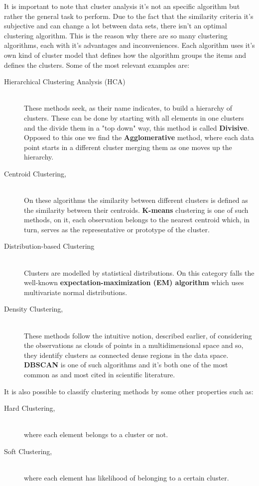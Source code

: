 It is important to note that cluster analysis it's not an specific algorithm but rather the general task to perform. Due to the fact that the similarity criteria it's subjective and can change a lot between data sets, there isn't an optimal clustering algorithm. This is the reason why there are so many  clustering algorithms, each with it's advantages and inconveniences. Each algorithm uses it's own kind of cluster model that defines how the algorithm groups the items and defines the clusters. Some of the most relevant examples are:

\begin{description}
\item [Hierarchical Clustering Analysis (HCA)] \hfill \\ 
These methods seek, as their name indicates, to build a hierarchy of clusters. These can be done by starting with all elements in one clusters and the divide them in a "top down" way, this method is called \textbf{Divisive}. Opposed to this one we find the \textbf{Agglomerative} method, where each data point starts in a different cluster merging them as one moves up the hierarchy.
\item [Centroid Clustering,] \hfill \\ 
On these algorithms the similarity between different clusters is defined as the similarity between their centroids. \textbf{K-means} clustering is one of such methods, on it, each observation belongs to the nearest centroid which, in turn, serves as the representative or prototype of the cluster.
\item [Distribution-based Clustering] \hfill \\ 
Clusters are modelled by statistical distributions. On this category falls the well-known \textbf{expectation-maximization (EM) algorithm} which uses multivariate normal distributions.
\item [Density Clustering,] \hfill \\ 
These methods follow the intuitive notion, described earlier, of considering the observations as clouds of points in a multidimensional space and so, they identify clusters as connected dense regions in the data space. \textbf{DBSCAN} is one of such algorithms and it's both one of the most common as and most cited in scientific literature. 
\end{description}


It is also possible to classify clustering methods by some other properties such as:

\begin{description}
\item [Hard Clustering,] \hfill \\ where each element belongs to a cluster or not.
\item [Soft Clustering,] \hfill \\ where each element has likelihood of belonging to a certain cluster.
\end{description}




